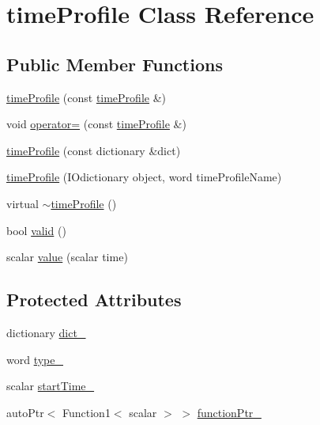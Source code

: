 \hypertarget{classFoam_1_1timeProfile}{}\section{time\+Profile Class Reference}
\label{classFoam_1_1timeProfile}
\subsection*{Public Member Functions}
\begin{DoxyCompactItemize}
\item 
\hyperlink{classFoam_1_1timeProfile_a5076b4ecf43c6e02c4c97cafe1243340}{time\+Profile} (const \hyperlink{classFoam_1_1timeProfile}{time\+Profile} \&)
\item 
void \hyperlink{classFoam_1_1timeProfile_a2909e2bb417056ae3bb3038213b5a509}{operator=} (const \hyperlink{classFoam_1_1timeProfile}{time\+Profile} \&)
\item 
\hyperlink{classFoam_1_1timeProfile_ac92fb8fde8b4ecb8eccc653894d361a6}{time\+Profile} (const dictionary \&dict)
\item 
\hyperlink{classFoam_1_1timeProfile_a7ac944da8a3372ee1800ecbc35d4dda2}{time\+Profile} (I\+Odictionary object, word time\+Profile\+Name)
\item 
virtual \hyperlink{classFoam_1_1timeProfile_a81645763c1def16d1eec37f26bb330c1}{$\sim$time\+Profile} ()
\item 
bool \hyperlink{classFoam_1_1timeProfile_a1153e3a77aa46ed8f7683e71c60f4584}{valid} ()
\item 
scalar \hyperlink{classFoam_1_1timeProfile_a18e8d053af1f216e0b4770d4e9104fc9}{value} (scalar time)
\end{DoxyCompactItemize}
\subsection*{Protected Attributes}
\begin{DoxyCompactItemize}
\item 
dictionary \hyperlink{classFoam_1_1timeProfile_a5c644b0ad2ff77590a77fb0198c4a785}{dict\+\_\+}
\item 
word \hyperlink{classFoam_1_1timeProfile_addee41d6ac047acd59c85e776d4e6fb9}{type\+\_\+}
\item 
scalar \hyperlink{classFoam_1_1timeProfile_ad3af15e21885db634f1c0a0aa207d674}{start\+Time\+\_\+}
\item 
auto\+Ptr$<$ Function1$<$ scalar $>$ $>$ \hyperlink{classFoam_1_1timeProfile_ae45cec85de6c65941ab18eff890a495e}{function\+Ptr\+\_\+}
\end{DoxyCompactItemize}


